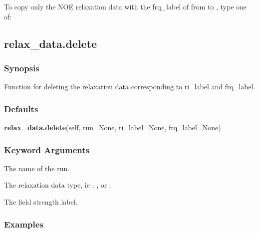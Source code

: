 




To copy  only the NOE relaxation  data with the frq\_label of 
 from 
 to 
, type one
of:





\newpage

\subsection{relax\_data.delete}


\subsubsection{Synopsis}

Function for deleting the relaxation data corresponding to ri\_label and frq\_label.

\subsubsection{Defaults}

\textsf{\textbf{relax\_data.delete}(self, run=None, ri\_label=None, frq\_label=None)}


\subsubsection{Keyword Arguments}


  The name of the run.

  The relaxation  data type, ie 
, 
, or 
.

  The field strength label.

\subsubsection{Examples}

